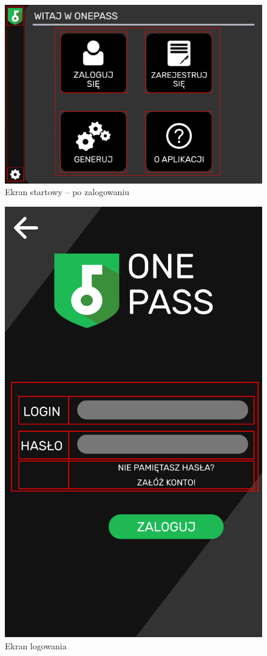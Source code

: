 \documentclass[a4paper]{article}
\begin{document}
\begin{figure}[H]
    \centering
    \includegraphics[width=1\textwidth]{img/ekran_po_zalogowanie.png}
    \caption{Ekran startowy -- po zalogowaniu}
    \label{fig:startPo}
\end{figure}

\begin{figure}[H]
    \centering
    \includegraphics[height=1\textwidth]{img/ekran_logowania.png}
    \caption{Ekran logowania}
    \label{fig:logowanie}
\end{figure}
\end{document}
